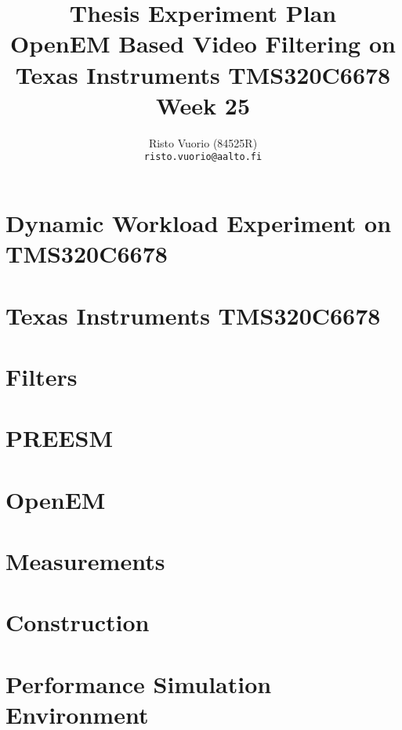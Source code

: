 \documentclass[a4paper,10pt]{article}
\title{Thesis Experiment Plan \\
		OpenEM Based Video Filtering on Texas Instruments TMS320C6678 \\
		Week 25}
\author{Risto Vuorio (84525R) \\
		{\tt risto.vuorio@aalto.fi}}
\begin{document}
\maketitle
\newpage
\tableofcontents
\newpage

\section{Dynamic Workload Experiment on TMS320C6678}


\section{Texas Instruments TMS320C6678}


\section{Filters}


\section{PREESM}


\section{OpenEM}


\section{Measurements}


\section{Construction}


\section{Performance Simulation Environment}


%   

%   
\end{document}
